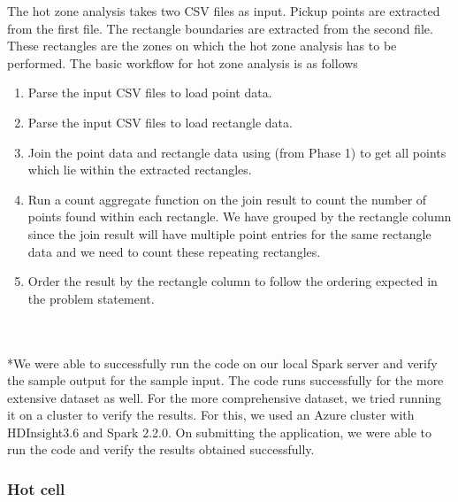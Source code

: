 The hot zone analysis takes two CSV files as input. Pickup points are extracted from the first file. The rectangle boundaries are extracted from the second file. These rectangles are the zones on which the hot zone analysis has to be performed. The basic workflow for hot zone analysis is as follows
\begin{enumerate}
    \item Parse the input CSV files to load point data.
    \item Parse the input CSV files to load rectangle data.
    \item  Join the point data and rectangle data using  (from Phase 1) to get all points which lie within the extracted rectangles. 
    \item Run a count aggregate function on the join result to count the number of points found within each rectangle. We have grouped by the rectangle column since the join result will have multiple point entries for the same rectangle data and we need to count these repeating rectangles.
    \item Order the result by the rectangle column to follow the ordering expected in the problem statement.
\end{enumerate}
\\
\\*We were able to successfully run the code on our local Spark server and verify the sample output for the sample input. The code runs successfully for the more extensive dataset as well. For the more comprehensive dataset, we tried running it on a cluster to verify the results. For this, we used an Azure cluster with HDInsight3.6 and Spark 2.2.0. On submitting the application, we were able to run the code and verify the results obtained successfully.

\subsubsection{Hot cell}

